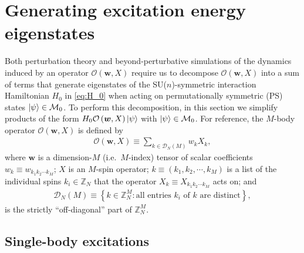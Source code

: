 \documentclass[nofootinbib,notitlepage,11pt]{revtex4-2}
\renewcommand{\t}{\text} %
\newcommand{\p}[1]{\left(#1\right)} %
\renewcommand{\set}[1]{\left\{#1\right\}} %
\newcommand{\m}{\bm} %
\newcommand{\1}{\mathds{1}}
\newcommand{\D}{\mathcal{D}}
\newcommand{\M}{\mathcal{M}}
\renewcommand{\O}{\mathcal{O}}
\newcommand{\ZZ}{\mathbb{Z}}
\begin{document}
\section{Generating excitation energy eigenstates}
\label{sec:eigenstates}

Both perturbation theory and beyond-perturbative simulations of the
dynamics induced by an operator $\O\p{\m w,X}$ require us to decompose
$\O\p{\m w,X}$ into a sum of terms that generate eigenstates of the
SU($n$)-symmetric interaction Hamiltonian $H_0$ in \eqref{eq:H_0} when
acting on permutationally symmetric (PS) states $\ket\psi\in\M_0$.  To
perform this decomposition, in this section we simplify products of
the form $H_0\O\p{\m w,X}\ket\psi$ with $\ket\psi\in\M_0$.  For
reference, the $M$-body operator $\O\p{\m w,X}$ is defined by
\begin{align}
  \O\p{\m w,X} \equiv \sum_{k\in\D_N\p{M}} w_k X_k,
\end{align}
where $\m w$ is a dimension-$M$ (i.e.~$M$-index) tensor of scalar
coefficients $w_k\equiv w_{k_1k_2\cdots k_M}$; $X$ is an $M$-spin
operator; $k\equiv\p{k_1,k_2,\cdots,k_M}$ is a list of the individual
spins $k_i\in\ZZ_N$ that the operator $X_k\equiv X_{k_1k_2\cdots k_M}$
acts on; and
\begin{align}
  \D_N\p{M} \equiv
  \set{ k \in \ZZ_N^M: \t{all entries $k_i$ of $k$ are distinct} },
\end{align}
is the strictly ``off-diagonal'' part of $\ZZ_N^M$.

\subsection{Single-body excitations}
\label{sec:single_body_eigenstates}
\end{document}
